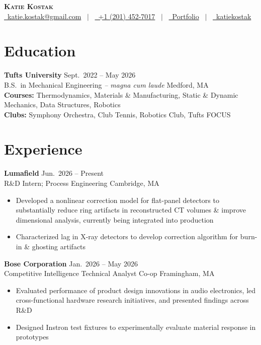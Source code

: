 \documentclass[a4paper, 10pt]{article}
\newcommand{\entrygap}{\vspace{5pt}}
\newcommand{\role}[1]{\textcolor{accent}{#1}}
\begin{document}
\fontsize{10}{12}\selectfont
\pagestyle{empty}

\begin{center}
  {\Huge\scshape\textbf{Katie Kostak}}\\[4pt]
  {\large
  \textcolor{accent}{\href{mailto:katie.kostak@gmail.com}{\raisebox{-0.05\height}{\faEnvelope}\ katie.kostak@gmail.com}}
  \ $|$ \
  \textcolor{accent}{\href{tel:+12014527017}{\raisebox{-0.05\height}{\faPhone}\ +1 (201) 452-7017}}
  \ $|$ \
  \textcolor{accent}{\href{https://kkostak.github.io}{\raisebox{-0.05\height}{\faWrench}\ Portfolio}}
  \ $|$ \
  \textcolor{accent}{\href{https://www.linkedin.com/in/katiekostak/}{\raisebox{-0.05\height}{\faLinkedin}\ katiekostak}}
  }
\end{center}

\section{Education}
\textbf{Tufts University} \hfill Sept.\ 2022 -- May 2026\\[1pt]
\role{B.S.\ in Mechanical Engineering} \textit{-- magna cum laude} \hfill \role{Medford, MA}\\[1pt]
\textbf{Courses:} Thermodynamics, Materials \& Manufacturing, Static \& Dynamic Mechanics, Data Structures, Robotics\\[1pt]
\textbf{Clubs:} Symphony Orchestra, Club Tennis, Robotics Club, Tufts FOCUS

\section{Experience}

\textbf{Lumafield} \hfill Jun.\ 2026 -- Present\\[1pt]
\role{R\&D Intern; Process Engineering} \hfill \role{Cambridge, MA}
\begin{itemize}
  \item Developed a nonlinear correction model for flat-panel detectors to substantially reduce ring artifacts in reconstructed CT volumes \& improve dimensional analysis, currently being integrated into production
  \item Characterized lag in X-ray detectors to develop correction algorithm for burn-in \& ghosting artifacts
\end{itemize}
\entrygap

\textbf{Bose Corporation} \hfill Jan.\ 2026 -- May 2026\\[1pt]
\role{Competitive Intelligence Technical Analyst Co-op} \hfill \role{Framingham, MA}
\begin{itemize}
  \item Evaluated performance of product design innovations in audio electronics, led cross-functional hardware research initiatives, and presented findings across R\&D
  \item Designed Instron test fixtures to experimentally evaluate material response in prototypes
\end{itemize}
\entrygap
\end{document}
